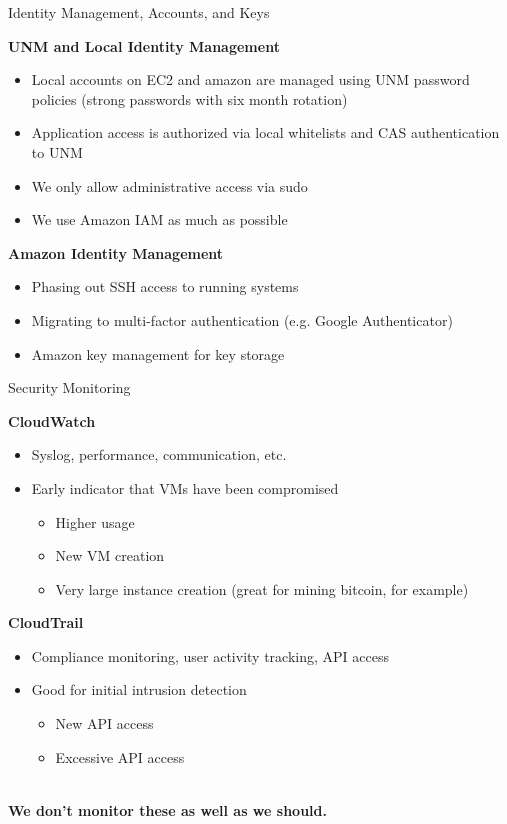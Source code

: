 \documentclass[t,handout]{beamer}   %
\begin{document}
\begin{frame}{Identity Management, Accounts, and Keys}

\textbf{UNM and Local Identity Management}
{\small
\begin{itemize}
\item Local accounts on EC2 and amazon are managed using UNM password policies (strong passwords with six month rotation)
\item Application access is authorized via local whitelists and CAS authentication to UNM
\item We only allow administrative access via sudo
\item We use Amazon IAM as much as possible
\end{itemize}
}

\textbf{Amazon Identity Management}
{\small
\begin{itemize}
\item Phasing out SSH access to running systems
\item Migrating to multi-factor authentication (e.g. Google Authenticator)~
\item Amazon key management for key storage
\end{itemize}
}
\end{frame}

\begin{frame}{Security Monitoring}

\textbf{CloudWatch}
{\small
\begin{itemize}
\item Syslog, performance, communication, etc.
\item Early indicator that VMs have been compromised
\begin{itemize}
\item Higher usage
\item New VM creation
\item Very large instance creation (great for mining bitcoin, for example)
\end{itemize}
\end{itemize}
}

\textbf{CloudTrail}
{\small
\begin{itemize}
\item Compliance monitoring, user activity tracking, API access
\item Good for initial intrusion detection
\begin{itemize}
\item New API access
\item Excessive API access
\end{itemize}
\end{itemize}
}
~\\

\centering
\textbf{We don't monitor these as well as we should.}

\end{frame}
\end{document}
